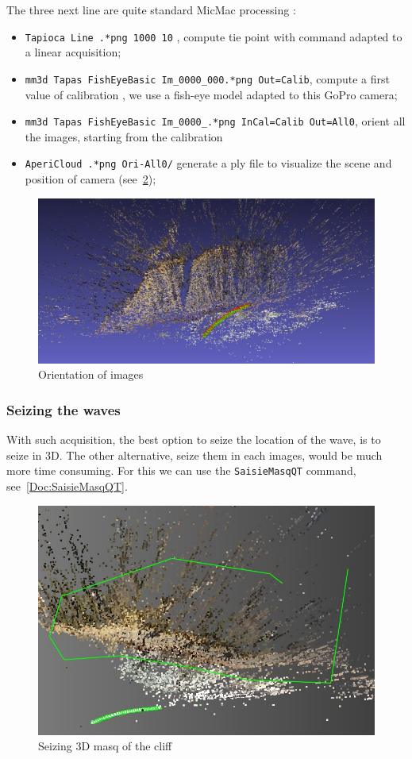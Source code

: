 The three next line are quite standard MicMac processing :

\begin{itemize}
    \item {\tt  Tapioca Line .*png 1000 10} , compute tie point with command adapted to a linear acquisition;
    \item {\tt  mm3d Tapas  FishEyeBasic Im\_0000\_000.*png Out=Calib}, compute a first value of calibration , we
         use a fish-eye model adapted to this GoPro camera;
    \item {\tt  mm3d Tapas  FishEyeBasic Im\_0000\_.*png InCal=Calib Out=All0}, orient all the images, starting from
         the calibration
    \item {\tt  AperiCloud  .*png Ori-All0/} generate a ply file to visualize the scene and position of camera (see~\ref{fig:GoProOri0});

\end{itemize}

\begin{figure}
\centering
\includegraphics[width=0.80\linewidth]{FIGS/GoProVideo/Aperi000.jpg}
\caption{Orientation of images}
\label{fig:GoProOri0}
\end{figure}


\subsubsection{Seizing the waves}

With such acquisition, the best option to seize the location of the wave, is to seize in 3D. The other alternative, 
seize them in each images, would be much more time consuming. For this we can use the {\tt SaisieMasqQT} command,
see~\ref{Doc:SaisieMasqQT}.


\begin{figure}
\centering
\includegraphics[width=0.80\linewidth]{FIGS/GoProVideo/Masq3D.jpg}
\caption{Seizing 3D masq  of the cliff}
\label{fig:GoProOri0}
\end{figure}

